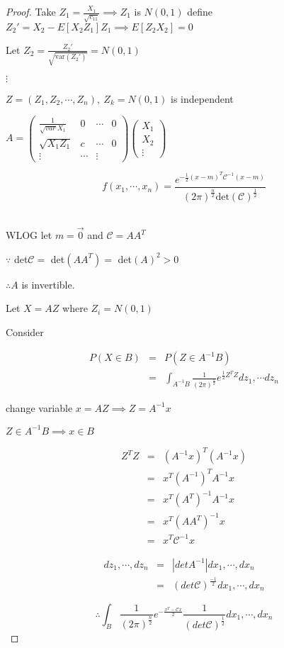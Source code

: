 \begin{proof}
	Take $Z_1 = \frac{X_1}{\sqrt{c_{11}}} \implies Z_1$ is $N(0,1)$ define $Z_2' = X_2 - E[X_2Z_1]Z_1 \implies E[Z_2X_2] = 0$
	
	Let $Z_2 = \frac{Z_2'}{\sqrt{\text{var}(Z_2')}} = N(0,1)$
	
	$\vdots$
	
	$Z = (Z_1,Z_2,\cdots,Z_n),~Z_k = N(0,1)$ is independent
	
	$A = 
	\left(\begin{matrix}
	\frac{1}{\sqrt{var}X_1} & 0 & \cdots & 0\\
	\sqrt{X_1Z_1} & c & \cdots & 0 \\
	\vdots & \cdots & \vdots
	\end{matrix}\right)
	\left(\begin{matrix}
	X_1\\
	X_2\\
	\vdots
	\end{matrix}\right)$
	
	$$f(x_1,\cdots,x_n) = \frac{e^{-\frac{1}{2}(x-m)^T\mathscr{C}^{-1}(x-m)}}{(2\pi)^{\frac{n}{2}}\text{det}(\mathscr{C})^{\frac{1}{2}}}$$\
	
	WLOG let $m = \vec{0}$ and $\mathscr{C} = AA^T$
	
	$\because$ det$\mathscr{C} =$ det$(AA^T) =$ det$(A)^2 > 0$
	
	$\therefore A$ is invertible.
	
	Let $X = AZ$ where $Z_i = N(0,1)$
	
	Consider
	
	\begin{eqnarray*}
		P(X \in B) &=& P(Z \in  A^{-1}B) \\
		&=& \int_{A^{-1}B} \frac{1}{(2\pi)^{\frac{\pi}{2}}}e^{\frac{1}{2}Z^TZ}dz_1,\cdots dz_n
	\end{eqnarray*}
	
	change variable $x = AZ \implies Z = A^{-1}x$
	
	$Z \in A^{-1}B \implies x \in B$
	
	\begin{eqnarray*}
		Z^TZ &=& (A^{-1}x)^T(A^{-1}x) \\
		&=& x^T(A^{-1})^TA^{-1}x\\
		&=& x^T(A^T)^{-1}A^{-1}x\\
		&=& x^T(AA^T)^{-1}x \\
		&=& x^T\mathscr{C}^{-1}x
	\end{eqnarray*}
	
	\begin{eqnarray*}
		dz_1,\cdots ,dz_n &=& |det A^{-1}|dx_1,\cdots,dx_n \\
		&=& (det \mathscr{C})^{\frac{-1}{2}}dx_1,\cdots , dx_n
	\end{eqnarray*}
	
	$$\therefore \int_B \frac{1}{(2\pi)^{\frac{n}{2}}}e^{-\frac{x^T-\mathscr{C}x}{2}} \frac{1}{(det \mathscr{C})^{\frac{1}{2}}}dx_1,\cdots,dx_n$$
\end{proof}



